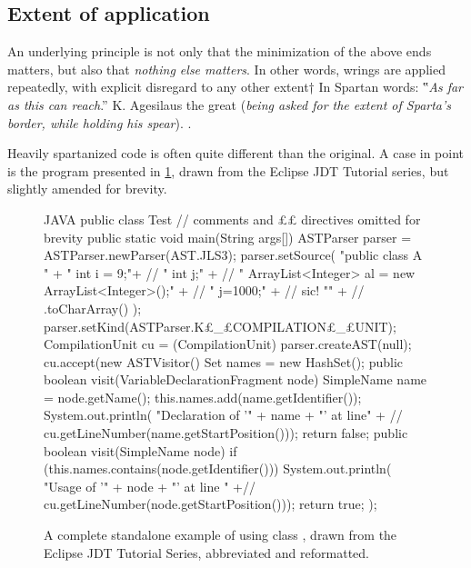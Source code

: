 \subsection{Extent of application}
An underlying principle is not only that the minimization of
the above ends matters, but also that \emph{nothing else matters}.
In other words, wrings are applied repeatedly, with explicit disregard
to any other extent†{%
  In Spartan words: ‟\textit{As far as this can reach}.” K. Agesilaus the
  great (\textsl{being asked for the extent of Sparta's border, while
  holding his spear}).
}.

Heavily spartanized code is often quite different than the original.  A case in
point is the \Java program presented in \cref{figure:eclipse}, drawn from the
Eclipse JDT Tutorial series,
but slightly amended for brevity.

\begin{figure}[H]
  \caption{A complete standalone example of using class , drawn
    from the Eclipse JDT Tutorial Series, abbreviated and reformatted.} 
    \label{figure:eclipse}
    \begin{adjustbox}{max width=\columnwidth}
      \begin{code}[minipage, width=1.13\columnwidth]{JAVA}
public class Test { // comments and ££ directives omitted for brevity
  public static void main(String args[]) {
    ASTParser parser = ASTParser.newParser(AST.JLS3);
    parser.setSource(
      "public class A {\n" + 
      "  int i = 9;\n"+ //
      "  int j;\n" + //
      "  ArrayList<Integer> al = new ArrayList<Integer>();\n" + //
      "  j=1000;\n" + // sic!
      "}\n" + //
      .toCharArray()
    );
    parser.setKind(ASTParser.K£\_£COMPILATION£\_£UNIT);
    CompilationUnit cu = (CompilationUnit) parser.createAST(null);
    cu.accept(new ASTVisitor() {
      Set names = new HashSet();
      public boolean visit(VariableDeclarationFragment node) {
        SimpleName name = node.getName();
        this.names.add(name.getIdentifier());
        System.out.println(
          "Declaration of '" + name + "' at line" + //
          cu.getLineNumber(name.getStartPosition()));
        return false; 
      }
      public boolean visit(SimpleName node) {
        if (this.names.contains(node.getIdentifier())) {
          System.out.println(
            "Usage of '" + node + "' at line " +//
            cu.getLineNumber(node.getStartPosition()));
        }
        return true;
      }
    });
  }
}
\end{code}
  \end{adjustbox}
\end{figure}

